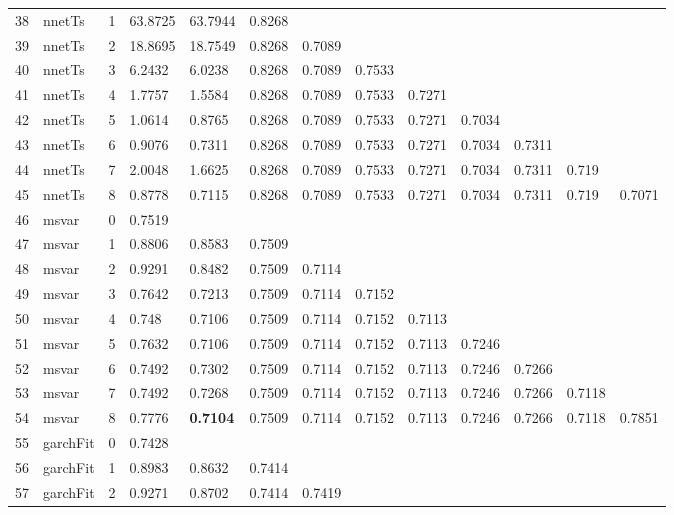 \documentclass[10pt,a4paper]{article}
\begin{document}
\begin{table}[ht]
\begin{tabular}{rlrllllllllll}
  38 & nnetTs &     1 & 63.8725 & 63.7944 & 0.8268 &  &  &  &  &  &  &  \\ 
  39 & nnetTs &     2 & 18.8695 & 18.7549 & 0.8268 & 0.7089 &  &  &  &  &  &  \\ 
  40 & nnetTs &     3 & 6.2432 & 6.0238 & 0.8268 & 0.7089 & 0.7533 &  &  &  &  &  \\ 
  41 & nnetTs &     4 & 1.7757 & 1.5584 & 0.8268 & 0.7089 & 0.7533 & 0.7271 &  &  &  &  \\ 
  42 & nnetTs &     5 & 1.0614 & 0.8765 & 0.8268 & 0.7089 & 0.7533 & 0.7271 & 0.7034 &  &  &  \\ 
  43 & nnetTs &     6 & 0.9076 & 0.7311 & 0.8268 & 0.7089 & 0.7533 & 0.7271 & 0.7034 & 0.7311 &  &  \\ 
  44 & nnetTs &     7 & 2.0048 & 1.6625 & 0.8268 & 0.7089 & 0.7533 & 0.7271 & 0.7034 & 0.7311 & 0.719 &  \\ 
  45 & nnetTs &     8 & 0.8778 & 0.7115 & 0.8268 & 0.7089 & 0.7533 & 0.7271 & 0.7034 & 0.7311 & 0.719 & 0.7071 \\ 
   \hline
46 & msvar &     0 & 0.7519 &  &  &  &  &  &  &  &  &  \\ 
  47 & msvar &     1 & 0.8806 & 0.8583 & 0.7509 &  &  &  &  &  &  &  \\ 
  48 & msvar &     2 & 0.9291 & 0.8482 & 0.7509 & 0.7114 &  &  &  &  &  &  \\ 
  49 & msvar &     3 & 0.7642 & 0.7213 & 0.7509 & 0.7114 & 0.7152 &  &  &  &  &  \\ 
  50 & msvar &     4 & 0.748 & 0.7106 & 0.7509 & 0.7114 & 0.7152 & 0.7113 &  &  &  &  \\ 
  51 & msvar &     5 & 0.7632 & 0.7106 & 0.7509 & 0.7114 & 0.7152 & 0.7113 & 0.7246 &  &  &  \\ 
  52 & msvar &     6 & 0.7492 & 0.7302 & 0.7509 & 0.7114 & 0.7152 & 0.7113 & 0.7246 & 0.7266 &  &  \\ 
  53 & msvar &     7 & 0.7492 & 0.7268 & 0.7509 & 0.7114 & 0.7152 & 0.7113 & 0.7246 & 0.7266 & 0.7118 &  \\ 
  54 & msvar &     8 & 0.7776 & \textbf{0.7104} & 0.7509 & 0.7114 & 0.7152 & 0.7113 & 0.7246 & 0.7266 & 0.7118 & 0.7851 \\ 
   \hline
55 & garchFit &     0 & 0.7428 &  &  &  &  &  &  &  &  &  \\ 
  56 & garchFit &     1 & 0.8983 & 0.8632 & 0.7414 &  &  &  &  &  &  &  \\ 
  57 & garchFit &     2 & 0.9271 & 0.8702 & 0.7414 & 0.7419 &  &  &  &  &  &  \\ 

\end{tabular}
\end{table}
\end{document}
